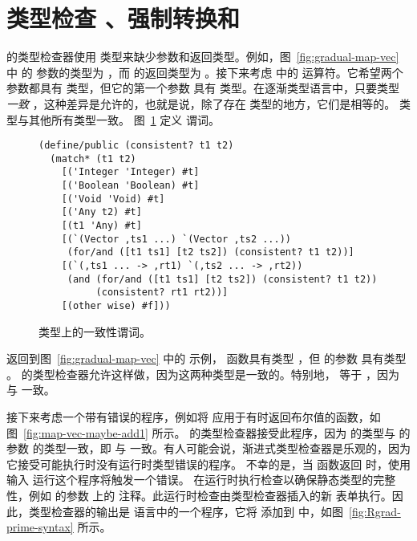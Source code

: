 \documentclass[11pt]{book}
\begin{document}
\section{类型检查 \LangGrad{} 、强制转换和 \LangCast{}}
\label{sec:gradual-type-check}

 \LangGrad{} 的类型检查器使用  类型来缺少参数和返回类型。例如，图~\ref{fig:gradual-map-vec} 中
 的  参数的类型为
 ，而  的返回类型为  。接下来考虑
 中的 \code{+} 运算符。它希望两个参数都具有  类型，但它的第一个参数 
具有  类型。在逐渐类型语言中，只要类型 \emph{一致} ，这种差异是允许的，也就是说，除了存在  类型的地方，它们是相等的。
 类型与其他所有类型一致。
图~\ref{fig:consistent} 定义  谓词。

\begin{figure}[tbp]
\begin{lstlisting}
(define/public (consistent? t1 t2)
  (match* (t1 t2)
    [('Integer 'Integer) #t]
    [('Boolean 'Boolean) #t]
    [('Void 'Void) #t]
    [('Any t2) #t]
    [(t1 'Any) #t]
    [(`(Vector ,ts1 ...) `(Vector ,ts2 ...))
     (for/and ([t1 ts1] [t2 ts2]) (consistent? t1 t2))]
    [(`(,ts1 ... -> ,rt1) `(,ts2 ... -> ,rt2))
     (and (for/and ([t1 ts1] [t2 ts2]) (consistent? t1 t2))
          (consistent? rt1 rt2))]
    [(other wise) #f]))
\end{lstlisting}
\caption{类型上的一致性谓词。}
\label{fig:consistent}
\end{figure}

返回到图~\ref{fig:gradual-map-vec} 中的  示例，  函数具有类型
 ，但  的参数  具有类型
 。 \LangGrad{} 的类型检查器允许这样做，因为这两种类型是一致的。特别地， \code{->} 等于 \code{->} ，因为  与  一致。

接下来考虑一个带有错误的程序，例如将
 应用于有时返回布尔值的函数，如图~\ref{fig:map-vec-maybe-add1} 所示。
\LangGrad{} 的类型检查器接受此程序，因为  的类型与  的参数 的类型一致，即  与  一致。有人可能会说，渐进式类型检查器是乐观的，因为它接受可能执行时没有运行时类型错误的程序。
%
不幸的是，当  函数返回  时，使用输入  运行这个程序将触发一个错误。 \LangGrad{} 在运行时执行检查以确保静态类型的完整性，例如  的参数
 上的  注释。此运行时检查由类型检查器插入的新  表单执行。因此，类型检查器的输出是 \LangCast{} 语言中的一个程序，它将  添加到 \LangLoop{} 中，如图~\ref{fig:Rgrad-prime-syntax} 所示。
\end{document}

